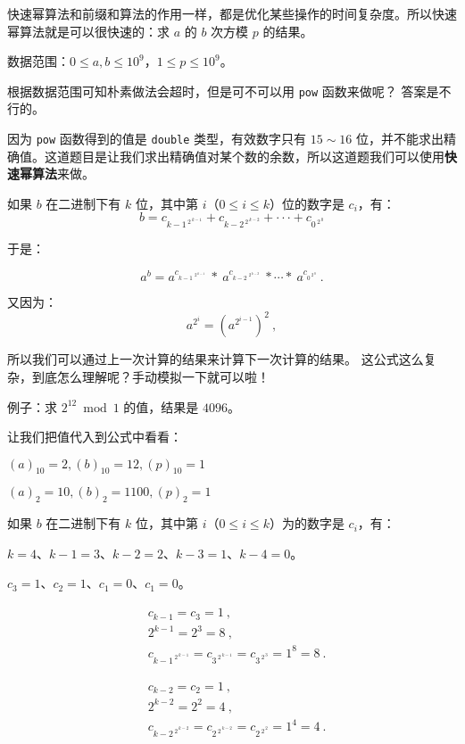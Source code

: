 
快速幂算法和前缀和算法的作用一样，都是优化某些操作的时间复杂度。所以快速幂算法就是可以很快速的：求 $a$ 的 $b$ 次方模 $p$ 的结果。

数据范围：$0 \le a,b \le 10^9$，$1 \le p \le 10^9$。

根据数据范围可知朴素做法会超时，但是可不可以用 \verb|pow| 函数来做呢？
答案是不行的。

因为 \verb|pow| 函数得到的值是 \verb|double| 类型，有效数字只有 $15\sim16$ 位，并不能求出精确值。这道题目是让我们求出精确值对某个数的余数，所以这道题我们可以使用\textbf{快速幂算法}来做。

如果 $b$ 在二进制下有 $k$ 位，其中第 $i$（$0 \le i \le k$）位的数字是 $c_i$，有：
\begin{equation}
b = c_{{k-1}^{\ 2^{\ k-1}}}+c_{{k-2}^{\ 2^{\ k-2}}}+\cdot\cdot\cdot+c_{{0}^{\ 2^{\ 0}}}
\end{equation}

于是：

\begin{equation}
a^b= a^{c_{{k-1}^{\ \ 2^{\ k-1}}}} \ *\  a^{c_{{k-2}^{\ \ 2^{\ k-2}}}} \ * \cdots * \ a^{c_{{0}^{\ 2^{\ 0}}}}~.
\end{equation}

又因为：
$$
a^{2^{i}} = (a^{2^{i-1}})^2~,
$$

所以我们可以通过上一次计算的结果来计算下一次计算的结果。
这公式这么复杂，到底怎么理解呢？手动模拟一下就可以啦！

例子：求 $2^{12} \bmod 1$ 的值，结果是 $4096$。

让我们把值代入到公式中看看：

$ (a) _ {10} =  2, (b) _ {10} = 12, (p) _ {10} = 1$

$ (a) _ 2 = 10, (b) _ 2 = 1100, (p) _ 2 = 1 $

如果 $b$ 在二进制下有 $k$ 位，其中第 $i$（$0 \le i \le k$）为的数字是 $c_i$，有：

$k = 4$、$k - 1 = 3$、$k - 2 = 2$、$k - 3 = 1$、$k - 4 = 0$。

$c_3 = 1$、$c_2 = 1$、$c_1 = 0$、$c_1 = 0$。

$$
\begin{aligned}
&c_{k - 1} = c_3 = 1~,\\
&2 ^ {k - 1} = 2 ^ 3 = 8~,\\
&c_{{k-1}^{\ 2^{\ k-1}}} = c_{{3}^{\ 2^{\ k-1}}} = c_{{3}^{\ 2^{\ 3}}} = 1^8 = 8~.
\end{aligned}
$$

$$
\begin{aligned}
&c_{k - 2} = c_2 = 1~,\\
&2 ^ {k - 2} = 2 ^ 2 = 4~,\\
&c_{{k-2}^{\ 2^{\ k-2}}} = c_{{2}^{\ 2^{\ k-2}}} = c_{{2}^{\ 2^{\ 2}}} = 1^4 = 4~.
\end{aligned}
$$

